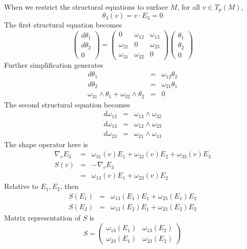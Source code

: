 \documentclass{article}
\newcommand{\exterior}{\wedge}
\begin{document}
When we restrict the structural equations to surface $M$, for all $v \in T_p
(M)$,
\[ \theta_3 (v) = v \cdot E_3 = 0 \]
The first structural equation becomes
\begin{equation}
  \left(\begin{array}{c}
    d \theta_1\\
    d \theta_2\\
    0
  \end{array}\right) = \left(\begin{array}{ccc}
    0 & \omega_{12} & \omega_{13}\\
    \omega_{21} & 0 & \omega_{23}\\
    \omega_{31} & \omega_{32} & 0
  \end{array}\right) \left(\begin{array}{c}
    \theta_1\\
    \theta_2\\
    0
  \end{array}\right)
\end{equation}
Further simplification generates
\begin{eqnarray}
  d \theta_1 & = & \omega_{12} \theta_2 \\
  d \theta_2 & = & \omega_{21} \theta_1 \\
  \omega_{31} \exterior \theta_1 + \omega_{32} \exterior \theta_2 & = & 0 
\end{eqnarray}
The second structural equation becomes
\begin{eqnarray}
  d \omega_{12} & = & \omega_{13} \exterior \omega_{32} \\
  d \omega_{13} & = & \omega_{12} \exterior \omega_{23} \\
  d \omega_{23} & = & \omega_{21} \exterior \omega_{13} 
\end{eqnarray}
The shape operator here is
\begin{eqnarray*}
  \nabla_v E_3 & = & \omega_{31} (v) E_1 + \omega_{32} (v) E_2 + \omega_{33}
  (v) E_3\\
  S (v) & = & - \nabla_v E_3\\
  & = & \omega_{13} (v) E_1 + \omega_{23} (v) E_2
\end{eqnarray*}
Relative to $E_1, E_2$, then
\begin{eqnarray*}
  S (E_1) & = & \omega_{13} (E_1) E_1 + \omega_{23} (E_1) E_2\\
  S (E_2) & = & \omega_{13} (E_2) E_1 + \omega_{23} (E_2) E_2
\end{eqnarray*}
Matrix representation of $S$ is
\[ S = \left(\begin{array}{cc}
     \omega_{13} (E_1) & \omega_{13} (E_2)\\
     \omega_{23} (E_1) & \omega_{23} (E_2)
   \end{array}\right) \]
\end{document}
